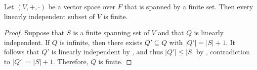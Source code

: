\begin{corollary}
  Let $(V, +, \cdot)$ be a vector space over $F$ that is spanned by a finite
  set. Then every linearly independent subset of $V$ is finite.
\end{corollary}
\begin{proof}
  Suppose that $S$ is a finite spanning set of $V$ and that $Q$ is linearly
  independent.
  If $Q$ is infinite, then there exists $Q' \subseteq Q$ with
  $|Q'| = |S| + 1$.
  It follows that $Q'$ is linearly independent by
  , and thus $|Q'| \leq |S|$ by
  , contradiction to $|Q'| = |S| + 1$.
  Therefore, $Q$ is finite.
\end{proof}